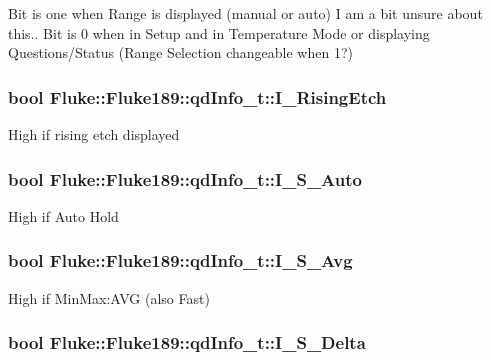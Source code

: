 \label{structFluke_1_1Fluke189_1_1qdInfo__t_a3655a4961481c568f66253ed879f0b8c}
Bit is one when Range is displayed (manual or auto) I am a bit unsure about this.. Bit is 0 when in Setup and in Temperature Mode or displaying Questions/Status (Range Selection changeable when 1?) \hypertarget{structFluke_1_1Fluke189_1_1qdInfo__t_a5006422f02c22ab8a426d6c983f0bc58}{
\subsubsection[{I\_\-RisingEtch}]{\setlength{\rightskip}{0pt plus 5cm}bool {\bf Fluke::Fluke189::qdInfo\_\-t::I\_\-RisingEtch}}}
\label{structFluke_1_1Fluke189_1_1qdInfo__t_a5006422f02c22ab8a426d6c983f0bc58}
High if rising etch displayed \hypertarget{structFluke_1_1Fluke189_1_1qdInfo__t_a75c9e0881b6444d045972dddfc2aee9f}{
\subsubsection[{I\_\-S\_\-Auto}]{\setlength{\rightskip}{0pt plus 5cm}bool {\bf Fluke::Fluke189::qdInfo\_\-t::I\_\-S\_\-Auto}}}
\label{structFluke_1_1Fluke189_1_1qdInfo__t_a75c9e0881b6444d045972dddfc2aee9f}
High if Auto Hold \hypertarget{structFluke_1_1Fluke189_1_1qdInfo__t_a71fd33b659921727255d1877005cef72}{
\subsubsection[{I\_\-S\_\-Avg}]{\setlength{\rightskip}{0pt plus 5cm}bool {\bf Fluke::Fluke189::qdInfo\_\-t::I\_\-S\_\-Avg}}}
\label{structFluke_1_1Fluke189_1_1qdInfo__t_a71fd33b659921727255d1877005cef72}
High if MinMax:AVG (also Fast) \hypertarget{structFluke_1_1Fluke189_1_1qdInfo__t_aed563d34e5b150077208fe97ee8dd47e}{
\subsubsection[{I\_\-S\_\-Delta}]{\setlength{\rightskip}{0pt plus 5cm}bool {\bf Fluke::Fluke189::qdInfo\_\-t::I\_\-S\_\-Delta}}}
